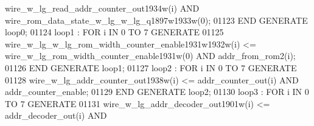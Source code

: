 \begin{DoxyCode}
{{      wire_w_lg_read_addr_counter_out1934w}\textcolor{vhdlchar}{(}\textcolor{vhdlchar}{i}\textcolor{vhdlchar}{)} \textcolor{keywordflow}{AND} \textcolor{vhdlchar}{
      wire_rom_data_state_w_lg_w_lg_q1897w1933w}\textcolor{vhdlchar}{(}\textcolor{vhdllogic}{}\textcolor{vhdllogic}{0}\textcolor{vhdlchar}{)};
01123     \textcolor{keywordflow}{END} \textcolor{keywordflow}{GENERATE} \textcolor{vhdlchar}{loop0};
01124     \textcolor{vhdlchar}{loop1} \textcolor{vhdlchar}{:} \textcolor{keywordflow}{FOR} \textcolor{vhdlchar}{i} \textcolor{keywordflow}{IN} \textcolor{vhdllogic}{}\textcolor{vhdllogic}{0} \textcolor{keywordflow}{TO} \textcolor{vhdllogic}{}\textcolor{vhdllogic}{7} \textcolor{keywordflow}{GENERATE} 
01125         \textcolor{vhdlchar}{wire_w_lg_w_lg_rom_width_counter_enable1931w1932w}\textcolor{vhdlchar}{(}\textcolor{vhdlchar}{i}\textcolor{vhdlchar}{)} \textcolor{vhdlchar}{<=} \textcolor{vhdlchar}{
      wire_w_lg_rom_width_counter_enable1931w}\textcolor{vhdlchar}{(}\textcolor{vhdllogic}{}\textcolor{vhdllogic}{0}\textcolor{vhdlchar}{)} \textcolor{keywordflow}{AND} \textcolor{vhdlchar}{addr_from_rom2}\textcolor{vhdlchar}{(}\textcolor{vhdlchar}{i}\textcolor{vhdlchar}{)};
01126     \textcolor{keywordflow}{END} \textcolor{keywordflow}{GENERATE} \textcolor{vhdlchar}{loop1};
01127     \textcolor{vhdlchar}{loop2} \textcolor{vhdlchar}{:} \textcolor{keywordflow}{FOR} \textcolor{vhdlchar}{i} \textcolor{keywordflow}{IN} \textcolor{vhdllogic}{}\textcolor{vhdllogic}{0} \textcolor{keywordflow}{TO} \textcolor{vhdllogic}{}\textcolor{vhdllogic}{7} \textcolor{keywordflow}{GENERATE} 
01128         \textcolor{vhdlchar}{wire_w_lg_addr_counter_out1938w}\textcolor{vhdlchar}{(}\textcolor{vhdlchar}{i}\textcolor{vhdlchar}{)} \textcolor{vhdlchar}{<=} \textcolor{vhdlchar}{addr_counter_out}\textcolor{vhdlchar}{(}\textcolor{vhdlchar}{i}\textcolor{vhdlchar}{)} \textcolor{keywordflow}{AND} \textcolor{vhdlchar}{
      addr_counter_enable};
01129     \textcolor{keywordflow}{END} \textcolor{keywordflow}{GENERATE} \textcolor{vhdlchar}{loop2};
01130     \textcolor{vhdlchar}{loop3} \textcolor{vhdlchar}{:} \textcolor{keywordflow}{FOR} \textcolor{vhdlchar}{i} \textcolor{keywordflow}{IN} \textcolor{vhdllogic}{}\textcolor{vhdllogic}{0} \textcolor{keywordflow}{TO} \textcolor{vhdllogic}{}\textcolor{vhdllogic}{7} \textcolor{keywordflow}{GENERATE} 
01131         \textcolor{vhdlchar}{wire_w_lg_addr_decoder_out1901w}\textcolor{vhdlchar}{(}\textcolor{vhdlchar}{i}\textcolor{vhdlchar}{)} \textcolor{vhdlchar}{<=} \textcolor{vhdlchar}{addr_decoder_out}\textcolor{vhdlchar}{(}\textcolor{vhdlchar}{i}\textcolor{vhdlchar}{)} \textcolor{keywordflow}{AND} \textcolor{vhdlchar}{
}}
\end{DoxyCode}
